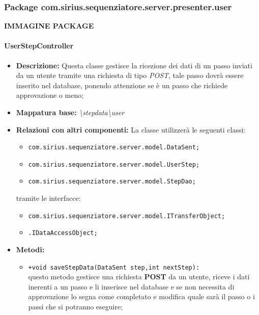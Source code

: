 \subsubsection{Package com.sirius.sequenziatore.server.presenter.user}
\textbf{IMMAGINE PACKAGE}
\paragraph{UserStepController}%
\begin{itemize}
	\item \textbf{Descrizione: } Questa classe gestisce la ricezione dei dati di un passo inviati da un utente tramite una richiesta di tipo \textit{POST}, tale passo dovrà essere inserito nel database, ponendo attenzione se è un passo che richiede approvazione o meno;
	\item \textbf{Mappatura base: } \textit{\textbackslash stepdata\textbackslash user}
	\item \textbf{Relazioni con altri componenti: }
	La classe utilizzerà le seguenti classi:
	\begin{itemize}
		\item \texttt{com.sirius.sequenziatore.server.model.DataSent;}
		\item \texttt{com.sirius.sequenziatore.server.model.UserStep;}
		\item \texttt{com.sirius.sequenziatore.server.model.StepDao;}
	\end{itemize}
	tramite le interfacce:
	\begin{itemize}
		\item \texttt{com.sirius.sequenziatore.server.model.ITransferObject;}
		\item \texttt{\sModel .IDataAccessObject;}
	\end{itemize}
	\item \textbf{Metodi: }\begin{itemize}
					\item \texttt{+void saveStepData(DataSent step,int nextStep):}\\
					questo metodo gestisce una richiesta \textbf{POST} da un utente, riceve i dati inerenti a un passo e li inserisce nel database e se non necessita di approvazione lo segna come completato e modifica quale sarà il passo o i passi che si potranno eseguire; 
				\end{itemize}
\end{itemize}
